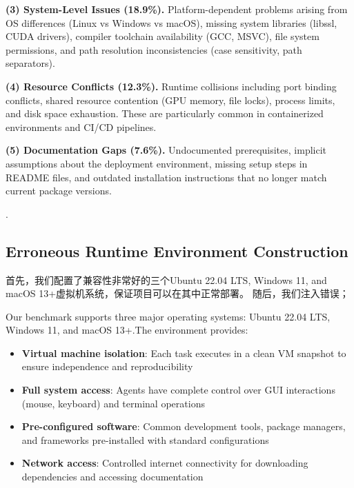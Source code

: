 \textbf{(3) System-Level Issues (18.9\%).} Platform-dependent problems arising from OS differences (Linux vs Windows vs macOS), missing system libraries (libssl, CUDA drivers), compiler toolchain availability (GCC, MSVC), file system permissions, and path resolution inconsistencies (case sensitivity, path separators).

\textbf{(4) Resource Conflicts (12.3\%).} Runtime collisions including port binding conflicts, shared resource contention (GPU memory, file locks), process limits, and disk space exhaustion. These are particularly common in containerized environments and CI/CD pipelines.

\textbf{(5) Documentation Gaps (7.6\%).} Undocumented prerequisites, implicit assumptions about the deployment environment, missing setup steps in README files, and outdated installation instructions that no longer match current package versions.


.

\subsection{Erroneous Runtime Environment Construction}\label{sec:environment}

首先，我们配置了兼容性非常好的三个Ubuntu 22.04 LTS, Windows 11, and macOS 13+虚拟机系统，保证项目可以在其中正常部署。
随后，我们注入错误；


Our benchmark supports three major operating systems: Ubuntu 22.04 LTS, Windows 11, and macOS 13+.The environment provides:

\begin{itemize}
\item \textbf{Virtual machine isolation}: Each task executes in a clean VM snapshot to ensure independence and reproducibility
\item \textbf{Full system access}: Agents have complete control over GUI interactions (mouse, keyboard) and terminal operations
\item \textbf{Pre-configured software}: Common development tools, package managers, and frameworks pre-installed with standard configurations
\item \textbf{Network access}: Controlled internet connectivity for downloading dependencies and accessing documentation
\end{itemize}


